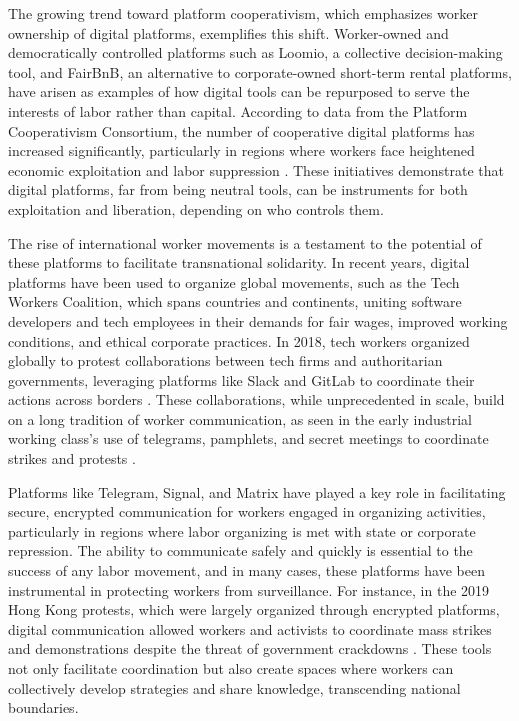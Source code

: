 \begin{refsection}
The growing trend toward platform cooperativism, which emphasizes worker ownership of digital platforms, exemplifies this shift. Worker-owned and democratically controlled platforms such as Loomio, a collective decision-making tool, and FairBnB, an alternative to corporate-owned short-term rental platforms, have arisen as examples of how digital tools can be repurposed to serve the interests of labor rather than capital. According to data from the Platform Cooperativism Consortium, the number of cooperative digital platforms has increased significantly, particularly in regions where workers face heightened economic exploitation and labor suppression \cite[pp.~17-19]{scholzplatformcoops}. These initiatives demonstrate that digital platforms, far from being neutral tools, can be instruments for both exploitation and liberation, depending on who controls them.

The rise of international worker movements is a testament to the potential of these platforms to facilitate transnational solidarity. In recent years, digital platforms have been used to organize global movements, such as the Tech Workers Coalition, which spans countries and continents, uniting software developers and tech employees in their demands for fair wages, improved working conditions, and ethical corporate practices. In 2018, tech workers organized globally to protest collaborations between tech firms and authoritarian governments, leveraging platforms like Slack and GitLab to coordinate their actions across borders \cite[pp.~120-123]{silverworkersmovement}. These collaborations, while unprecedented in scale, build on a long tradition of worker communication, as seen in the early industrial working class’s use of telegrams, pamphlets, and secret meetings to coordinate strikes and protests \cite[pp.~213-215]{engelsworkingclass}.

Platforms like Telegram, Signal, and Matrix have played a key role in facilitating secure, encrypted communication for workers engaged in organizing activities, particularly in regions where labor organizing is met with state or corporate repression. The ability to communicate safely and quickly is essential to the success of any labor movement, and in many cases, these platforms have been instrumental in protecting workers from surveillance. For instance, in the 2019 Hong Kong protests, which were largely organized through encrypted platforms, digital communication allowed workers and activists to coordinate mass strikes and demonstrations despite the threat of government crackdowns \cite[pp.~45]{stallmanfreesoftware}. These tools not only facilitate coordination but also create spaces where workers can collectively develop strategies and share knowledge, transcending national boundaries.


\end{refsection}
